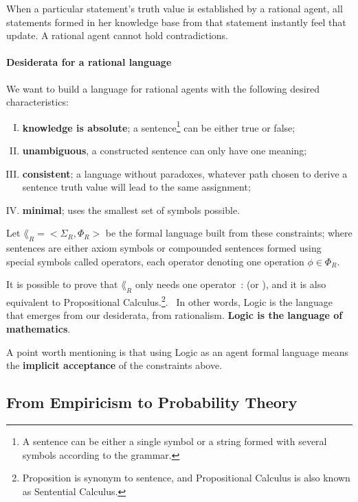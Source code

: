 When a particular statement's truth value is established by a rational agent, all statements formed in her knowledge base from that statement instantly feel that update. A rational agent cannot hold contradictions.

\paragraph{Desiderata for a rational language}\label{sec:desiderata_language}

We want to build a language for rational agents with the following desired characteristics:
\begin{enumerate}
	[I.]
	\item \textbf{knowledge is absolute}; a sentence\footnote{A sentence can be either a single symbol or a string formed with several symbols according to the grammar.} can be either true or false;
	\item \textbf{unambiguous}, a constructed sentence can only have one meaning;
	\item \textbf{consistent}; a language without paradoxes, \ie whatever path chosen to derive a sentence truth value will lead to the same assignment;
	\item \textbf{minimal}; uses the smallest set of symbols possible.
\end{enumerate}

Let \(\lang_R= <\Sigma_R, \Phi_R>\) be the formal language built from these constraints; where sentences are either axiom symbols or compounded sentences formed using special symbols called operators, each operator denoting one operation \(\phi \in \Phi_R\).

It is possible to prove\label{future:prove_minimal_language_logic} that \(\lang_R\) only needs one operator~\cite{sowinski:2016,jaynes:2003}:  (or ), and it is also equivalent to Propositional Calculus.\footnote{Proposition is synonym to sentence, and Propositional Calculus is also known as Sentential Calculus.}.~\label{insert_appendix} In other words, Logic is the language that emerges from our desiderata, from rationalism. \textbf{Logic is the language of mathematics}.

A point worth mentioning is that using Logic as an agent formal language means the \textbf{implicit acceptance} of the constraints above.

\subsection{From Empiricism to Probability Theory}

